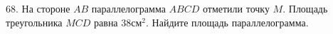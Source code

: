 68. На стороне $AB$ параллелограмма $ABCD$ отметили точку $M.$ Площадь треугольника $MCD$ равна $38\text{см}^2.$ Найдите площадь параллелограмма.\\

